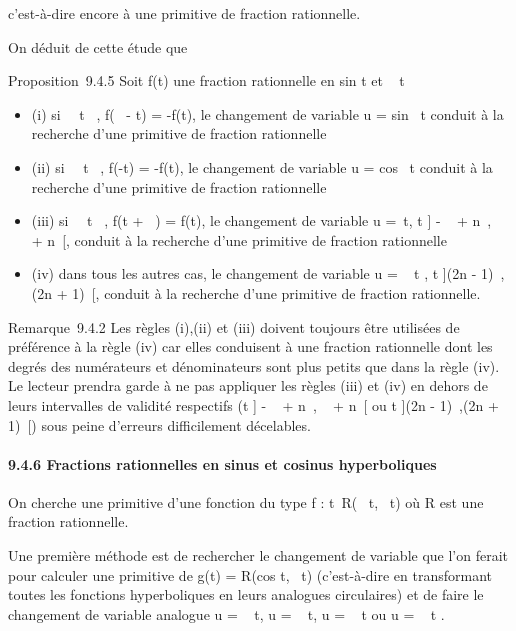 \documentclass[]{article}
\begin{document}
c'est-à-dire encore à une primitive de fraction rationnelle.

On déduit de cette étude que

Proposition~9.4.5 Soit f(t) une fraction rationnelle en
sin t et \cos~ t

\begin{itemize}
\itemsep1pt\parskip0pt
\item
  (i) si \forall~~t \in {}~, f(\pi~ - t) = -f(t), le
  changement de variable u = sin~ t conduit à
  la recherche d'une primitive de fraction rationnelle
\item
  (ii) si \forall~~t \in {}~, f(-t) = -f(t), le changement
  de variable u = cos~ t conduit à la recherche
  d'une primitive de fraction rationnelle
\item
  (iii) si \forall~~t \in {}~, f(t + \pi~) = f(t), le
  changement de variable u =\
  \mathrmtg t, t \in] - \pi~  + n\pi~, \pi~ \over 2 + n\pi~[, conduit à la recherche
  d'une primitive de fraction rationnelle
\item
  (iv) dans tous les autres cas, le changement de variable u
  = \mathrmtg~  t
   , t \in](2n - 1)\pi~,(2n + 1)\pi~[, conduit à la
  recherche d'une primitive de fraction rationnelle.
\end{itemize}

Remarque~9.4.2 Les règles (i),(ii) et (iii) doivent toujours être
utilisées de préférence à la règle (iv) car elles conduisent à une
fraction rationnelle dont les degrés des numérateurs et dénominateurs
sont plus petits que dans la règle (iv). Le lecteur prendra garde à ne
pas appliquer les règles (iii) et (iv) en dehors de leurs intervalles de
validité respectifs (t \in] - \pi~  + n\pi~, \pi~
\over 2 + n\pi~[ ou t \in](2n - 1)\pi~,(2n + 1)\pi~[) sous
peine d'erreurs difficilement décelables.

\paragraph{9.4.6 Fractions rationnelles en sinus et cosinus
hyperboliques}

On cherche une primitive d'une fonction du type f :
t\mapsto~R(\mathrmch~
t,\mathrmsh~ t) où R est une
fraction rationnelle.

Une première méthode est de rechercher le changement de variable que
l'on ferait pour calculer une primitive de g(t) =
R(cos t,\sin~ t)
(c'est-à-dire en transformant toutes les fonctions hyperboliques en
leurs analogues circulaires) et de faire le changement de variable
analogue u = \mathrmsh~ t, u
= \mathrmch~ t, u
= \mathrmth~ t ou u
= \mathrmth~  t
 .
\end{document}
